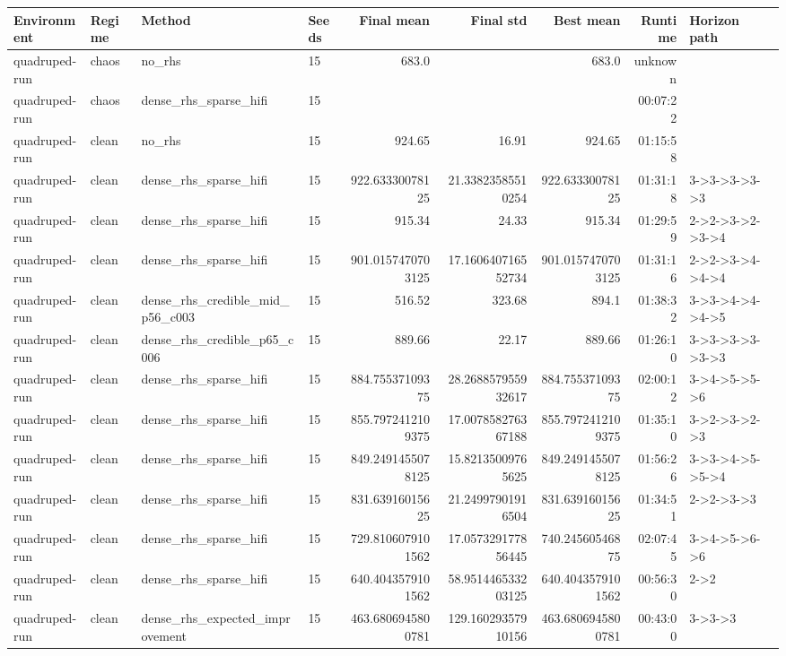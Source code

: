 \begin{tabular}{llllrrrrl}
\toprule
Environment & Regime & Method & Seeds & Final mean & Final std & Best mean & Runtime & Horizon path \\
\midrule
quadruped-run & chaos & no\_rhs & 15 & 683.0 &  & 683.0 & unknown &  \\
quadruped-run & chaos & dense\_rhs\_sparse\_hifi & 15 &  &  &  & 00:07:22 &  \\
quadruped-run & clean & no\_rhs & 15 & 924.65 & 16.91 & 924.65 & 01:15:58 &  \\
quadruped-run & clean & dense\_rhs\_sparse\_hifi & 15 & 922.63330078125 & 21.33823585510254 & 922.63330078125 & 01:31:18 & 3->3->3->3->3 \\
quadruped-run & clean & dense\_rhs\_sparse\_hifi & 15 & 915.34 & 24.33 & 915.34 & 01:29:59 & 2->2->3->2->3->4 \\
quadruped-run & clean & dense\_rhs\_sparse\_hifi & 15 & 901.0157470703125 & 17.160640716552734 & 901.0157470703125 & 01:31:16 & 2->2->3->4->4->4 \\
quadruped-run & clean & dense\_rhs\_credible\_mid\_p56\_c003 & 15 & 516.52 & 323.68 & 894.1 & 01:38:32 & 3->3->4->4->4->5 \\
quadruped-run & clean & dense\_rhs\_credible\_p65\_c006 & 15 & 889.66 & 22.17 & 889.66 & 01:26:10 & 3->3->3->3->3->3 \\
quadruped-run & clean & dense\_rhs\_sparse\_hifi & 15 & 884.75537109375 & 28.268857955932617 & 884.75537109375 & 02:00:12 & 3->4->5->5->6 \\
quadruped-run & clean & dense\_rhs\_sparse\_hifi & 15 & 855.7972412109375 & 17.007858276367188 & 855.7972412109375 & 01:35:10 & 3->2->3->2->3 \\
quadruped-run & clean & dense\_rhs\_sparse\_hifi & 15 & 849.2491455078125 & 15.82135009765625 & 849.2491455078125 & 01:56:26 & 3->3->4->5->5->4 \\
quadruped-run & clean & dense\_rhs\_sparse\_hifi & 15 & 831.63916015625 & 21.24997901916504 & 831.63916015625 & 01:34:51 & 2->2->3->3 \\
quadruped-run & clean & dense\_rhs\_sparse\_hifi & 15 & 729.8106079101562 & 17.057329177856445 & 740.24560546875 & 02:07:45 & 3->4->5->6->6 \\
quadruped-run & clean & dense\_rhs\_sparse\_hifi & 15 & 640.4043579101562 & 58.951446533203125 & 640.4043579101562 & 00:56:30 & 2->2 \\
quadruped-run & clean & dense\_rhs\_expected\_improvement & 15 & 463.6806945800781 & 129.16029357910156 & 463.6806945800781 & 00:43:00 & 3->3->3 \\

\end{tabular}

